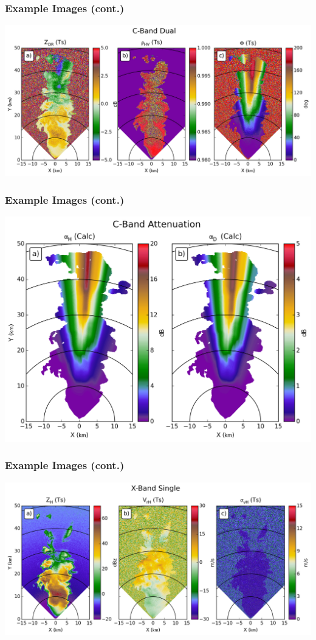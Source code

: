\documentclass[red]{beamer}
\begin{document}
\begin{frame}
	\frametitle{Example Images (cont.)}
	\includegraphics[scale=0.4]{figures/C_Dual.png}
\end{frame}

\begin{frame}
	\frametitle{Example Images (cont.)}
	\begin{center}
		\includegraphics[scale=0.4]{figures/C_Attenuation.png}
	\end{center}
\end{frame}

\begin{frame}
	\frametitle{Example Images (cont.)}
	\includegraphics[scale=0.4]{figures/X_Single.png}
\end{frame}
\end{document}
